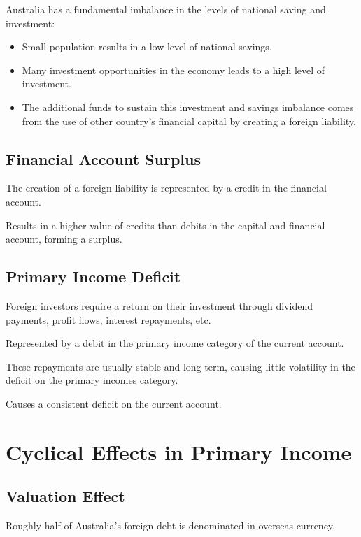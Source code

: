 \documentclass[a4paper,11pt]{report}
\begin{document}
Australia has a fundamental imbalance in the levels of national saving and
investment:

\begin{itemize}
\item Small population results in a low level of national savings.
\item Many investment opportunities in the economy leads to a high level of
	investment.
\item The additional funds to sustain this investment and savings imbalance
	comes from the use of other country's financial capital by creating a
	foreign liability.
\end{itemize}

\subsection{Financial Account Surplus}

The creation of a foreign liability is represented by a credit in the financial
account.

Results in a higher value of credits than debits in the capital and financial
account, forming a surplus.

\subsection{Primary Income Deficit}

Foreign investors require a return on their investment through dividend
payments, profit flows, interest repayments, etc.

Represented by a debit in the primary income category of the current account.

These repayments are usually stable and long term, causing little volatility
in the deficit on the primary incomes category.

Causes a consistent deficit on the current account.


\section{Cyclical Effects in Primary Income}

\subsection{Valuation Effect}

Roughly half of Australia's foreign debt is denominated in overseas currency.
\end{document}
